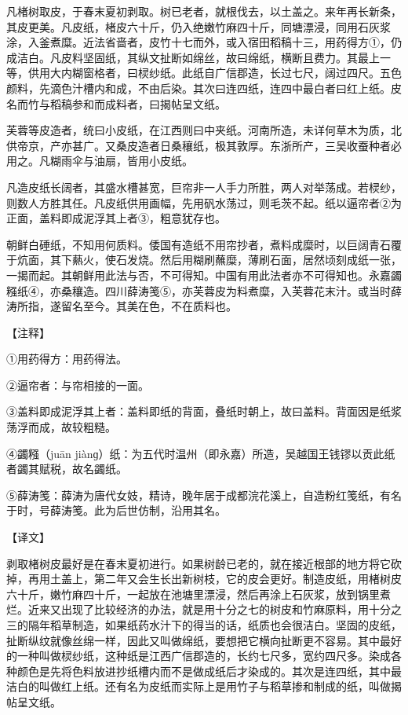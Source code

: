 \documentclass[12pt,UTF8]{ctexbook}
\begin{document}
凡楮树取皮，于春末夏初剥取。树已老者，就根伐去，以土盖之。来年再长新条，其皮更美。凡皮纸，楮皮六十斤，仍入绝嫩竹麻四十斤，同塘漂浸，同用石灰浆涂，入釜煮糜。近法省啬者，皮竹十七而外，或入宿田稻稿十三，用药得方①，仍成洁白。凡皮料坚固纸，其纵文扯断如绵丝，故曰绵纸，横断且费力。其最上一等，供用大内糊窗格者，曰棂纱纸。此纸自广信郡造，长过七尺，阔过四尺。五色颜料，先滴色汁槽内和成，不由后染。其次曰连四纸，连四中最白者曰红上纸。皮名而竹与稻稿参和而成料者，曰揭帖呈文纸。

芙蓉等皮造者，统曰小皮纸，在江西则曰中夹纸。河南所造，未详何草木为质，北供帝京，产亦甚广。又桑皮造者日桑穰纸，极其敦厚。东浙所产，三吴收蚕种者必用之。凡糊雨伞与油扇，皆用小皮纸。

凡造皮纸长阔者，其盛水槽甚宽，巨帘非一人手力所胜，两人对举荡成。若棂纱，则数人方胜其任。凡皮纸供用画幅，先用矾水荡过，则毛茨不起。纸以逼帘者②为正面，盖料即成泥浮其上者③，粗意犹存也。

朝鲜白硾纸，不知用何质料。倭国有造纸不用帘抄者，煮料成糜时，以巨阔青石覆于炕面，其下爇火，使石发烧。然后用糊刷蘸糜，薄刷石面，居然顷刻成纸一张，一揭而起。其朝鲜用此法与否，不可得知。中国有用此法者亦不可得知也。永嘉蠲糨纸④，亦桑穰造。四川薛涛笺⑤，亦芙蓉皮为料煮糜，入芙蓉花末汁。或当时薛涛所指，遂留名至今。其美在色，不在质料也。

【注释】

①用药得方：用药得法。

②逼帘者：与帘相接的一面。

③盖料即成泥浮其上者：盖料即纸的背面，叠纸时朝上，故曰盖料。背面因是纸浆荡浮而成，故较粗糙。

④蠲糨（juān jiànɡ）纸：为五代时温州（即永嘉）所造，吴越国王钱镠以贡此纸者蠲其赋税，故名蠲纸。

⑤薛涛笺：薛涛为唐代女妓，精诗，晚年居于成都浣花溪上，自造粉红笺纸，有名于时，号薛涛笺。此为后世仿制，沿用其名。

【译文】

剥取楮树皮最好是在春末夏初进行。如果树龄已老的，就在接近根部的地方将它砍掉，再用土盖上，第二年又会生长出新树枝，它的皮会更好。制造皮纸，用楮树皮六十斤，嫩竹麻四十斤，一起放在池塘里漂浸，然后再涂上石灰浆，放到锅里煮烂。近来又出现了比较经济的办法，就是用十分之七的树皮和竹麻原料，用十分之三的隔年稻草制造，如果纸药水汁下的得当的话，纸质也会很洁白。坚固的皮纸，扯断纵纹就像丝绵一样，因此又叫做绵纸，要想把它横向扯断更不容易。其中最好的一种叫做棂纱纸，这种纸是江西广信郡造的，长约七尺多，宽约四尺多。染成各种颜色是先将色料放进抄纸槽内而不是做成纸后才染成的。其次是连四纸，其中最洁白的叫做红上纸。还有名为皮纸而实际上是用竹子与稻草掺和制成的纸，叫做揭帖呈文纸。
\end{document}
